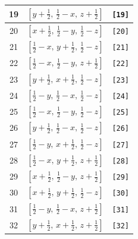 \documentclass[fleqn,8pt]{jsarticle}
\begin{document}
\begin{longtable}{ccc}
19 & $\left[ y + \frac{1}{2},\, \frac{1}{2} - x,\, z + \frac{1}{2} \right]$ & {\tt [19]} \\ \hline
20 & $\left[ x + \frac{1}{2},\, \frac{1}{2} - y,\, \frac{1}{2} - z \right]$ & {\tt [20]} \\ \hline
21 & $\left[ \frac{1}{2} - x,\, y + \frac{1}{2},\, \frac{1}{2} - z \right]$ & {\tt [21]} \\ \hline
22 & $\left[ \frac{1}{2} - x,\, \frac{1}{2} - y,\, z + \frac{1}{2} \right]$ & {\tt [22]} \\ \hline
23 & $\left[ y + \frac{1}{2},\, x + \frac{1}{2},\, \frac{1}{2} - z \right]$ & {\tt [23]} \\ \hline
24 & $\left[ \frac{1}{2} - y,\, \frac{1}{2} - x,\, \frac{1}{2} - z \right]$ & {\tt [24]} \\ \hline
25 & $\left[ \frac{1}{2} - x,\, \frac{1}{2} - y,\, \frac{1}{2} - z \right]$ & {\tt [25]} \\ \hline
26 & $\left[ y + \frac{1}{2},\, \frac{1}{2} - x,\, \frac{1}{2} - z \right]$ & {\tt [26]} \\ \hline
27 & $\left[ \frac{1}{2} - y,\, x + \frac{1}{2},\, \frac{1}{2} - z \right]$ & {\tt [27]} \\ \hline
28 & $\left[ \frac{1}{2} - x,\, y + \frac{1}{2},\, z + \frac{1}{2} \right]$ & {\tt [28]} \\ \hline
29 & $\left[ x + \frac{1}{2},\, \frac{1}{2} - y,\, z + \frac{1}{2} \right]$ & {\tt [29]} \\ \hline
30 & $\left[ x + \frac{1}{2},\, y + \frac{1}{2},\, \frac{1}{2} - z \right]$ & {\tt [30]} \\ \hline
31 & $\left[ \frac{1}{2} - y,\, \frac{1}{2} - x,\, z + \frac{1}{2} \right]$ & {\tt [31]} \\ \hline
32 & $\left[ y + \frac{1}{2},\, x + \frac{1}{2},\, z + \frac{1}{2} \right]$ & {\tt [32]} \\
\end{longtable}
\end{document}
